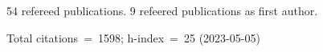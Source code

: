 54 refereed publications. 9 refeered publications as first author.

Total citations~=~1598; h-index~=~25 (2023-05-05)